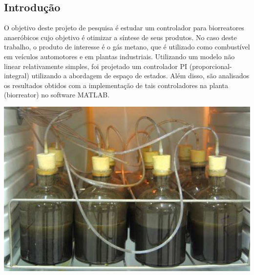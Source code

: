 \documentclass[a0,portrait]{a0poster}
\begin{document}
\begin{multicols}{2} %


\color{Black} 



\color{black} %

\section*{Introdução}
\quad O objetivo deste projeto de pesquisa é estudar um controlador para biorreatores anaeróbicos cujo objetivo é otimizar a síntese de seus produtos.  No caso deste trabalho, o produto de interesse é o gás metano, que é utilizado como combustível em veículos automotores e em plantas industriais.  Utilizando um modelo não linear relativamente simples, foi projetado um controlador PI (proporcional-integral) utilizando a abordagem de espaço de estados. Além disso, são analisados os resultados obtidos com a implementação de tais controladores na planta (biorreator) no software MATLAB. 

\begin{center}\vspace{1cm}
\includegraphics[width=0.4\linewidth]{biorreator.png}
\label{fig:bioquimica}
\end{center}%



\end{multicols}
\end{document}
